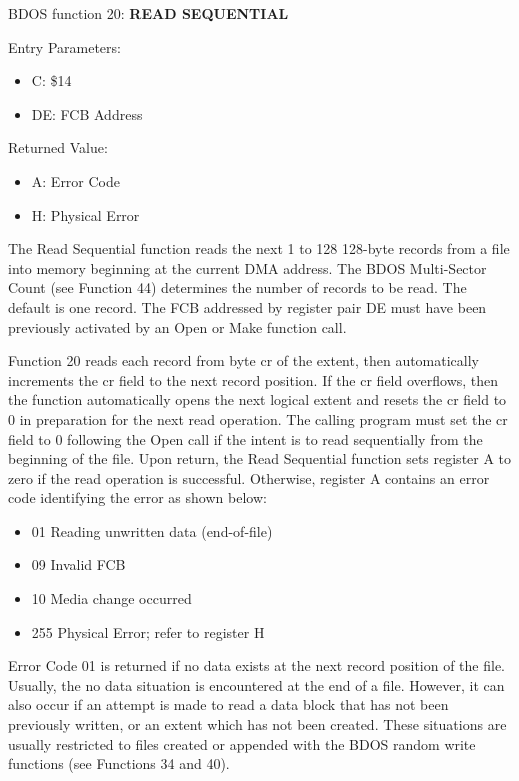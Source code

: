 BDOS function 20: \textbf{READ SEQUENTIAL}

Entry Parameters:
\begin{itemize}
\item[] C: \$14
\item[] DE: FCB Address
\end{itemize}

Returned Value:
\begin{itemize}
\item[] A: Error Code
\item[] H: Physical Error
\end{itemize}

The Read Sequential function reads the next 1 to 128 128-byte records
from a file into memory beginning at the current DMA address. The BDOS
Multi-Sector Count (see Function 44) determines the number of records
to be read. The default is one record. The FCB addressed by register
pair DE must have been previously activated by an Open or Make
function call.

Function 20 reads each record from byte cr of the extent, then
automatically increments the cr field to the next record position. If
the cr field overflows, then the function automatically opens the next
logical extent and resets the cr field to 0 in preparation for the
next read operation. The calling program must set the cr field to 0
following the Open call if the intent is to read sequentially from the
beginning of the file.  Upon return, the Read Sequential function sets
register A to zero if the read operation is successful. Otherwise,
register A contains an error code identifying the error as shown
below:

\begin{itemize}
\item 01 Reading unwritten data (end-of-file)
\item 09 Invalid FCB
\item 10 Media change occurred
\item 255 Physical Error; refer to register H
\end{itemize}

Error Code 01 is returned if no data exists at the next record
position of the file.  Usually, the no data situation is encountered
at the end of a file. However, it can also occur if an attempt is made
to read a data block that has not been previously written, or an
extent which has not been created. These situations are usually
restricted to files created or appended with the BDOS random write
functions (see Functions 34 and 40).

